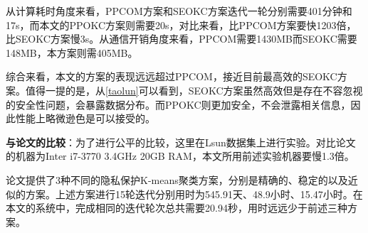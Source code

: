 \begin{table}[htbp]
	\centering
	\renewcommand{\arraystretch}{1.3} %
	\caption{通信与计算开销对比($n=8192,m=5,k=3$)}
	\label{s3-ta-duibi}
\end{table}
从计算耗时角度来看，PPCOM方案和SEOKC方案迭代一轮分别需要401分钟和17s，而本文的PPOKC方案则需要20s，对比来看，比PPCOM方案要快1203倍，比SEOKC方案慢3s。从通信开销角度来看，PPCOM需要1430MB而SEOKC需要148MB，本方案则需405MB。

综合来看，本文的方案的表现远远超过PPCOM，接近目前最高效的SEOKC方案。值得一提的是，从\ref{taolun}可以看到，SEOKC方案虽然高效但是存在不容忽视的安全性问题，会暴露数据分布。而PPOKC则更加安全，不会泄露相关信息，因此性能上略微逊色是可以接受的。

\textbf{与论文\cite{jaschke2019unsupervised}的比较}：为了进行公平的比较，这里在Lsun数据集上进行实验。对比论文的机器为Inter i7-3770 3.4GHz 20GB RAM，本文所用前述实验机器要慢1.3倍。

论文\cite{jaschke2019unsupervised}提供了3种不同的隐私保护K-means聚类方案，分别是精确的、稳定的以及近似的方案。上述方案进行15轮迭代分别用时为545.91天、48.9小时、15.47小时。在本文的系统中，完成相同的迭代轮次总共需要20.94秒，用时远远少于前述三种方案。

